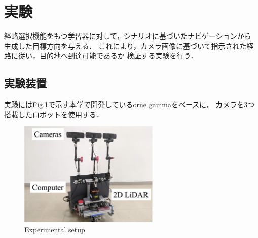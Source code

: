 \documentclass{sice-si}
\begin{document}
\section{実験}
経路選択機能をもつ学習器に対して，シナリオに基づいたナビゲーションから
生成した目標方向を与える．
これにより，カメラ画像に基づいて指示された経路に従い，目的地へ到達可能であるか
検証する実験を行う．

\subsection{実験装置}
実験にはFig.\ref{fig:gamma}で示す本学で開発しているorne gammaをベースに，
カメラを3つ搭載したロボットを使用する．
\begin{figure}[htbp]
    \centering
     \includegraphics[height=50mm]{./figs/gamma_sensor.png}
     \caption{Experimental setup}\label{fig:gamma}
\end{figure}
\end{document}
